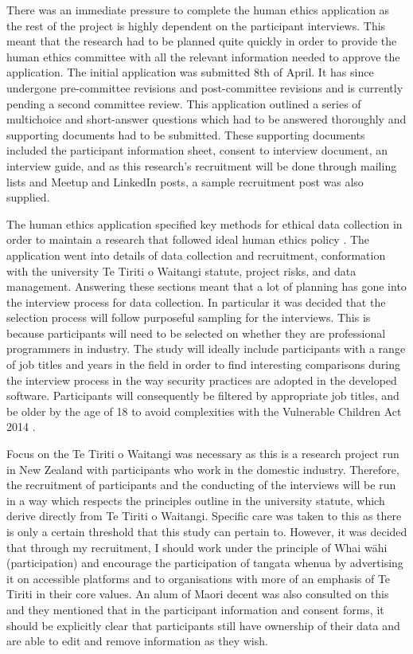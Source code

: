 \par There was an immediate pressure to complete the human ethics application as the rest of the project is highly dependent on the participant interviews. This meant that the research had to be planned quite quickly in order to provide the human ethics committee with all the relevant information needed to approve the application. The initial application was submitted 8th of April. It has since undergone pre-committee revisions and post-committee revisions and is currently pending a second committee review. This application outlined a series of multichoice and short-answer questions which had to be answered thoroughly and supporting documents had to be submitted. These supporting documents included the participant information sheet, consent to interview document, an interview guide, and as this research’s recruitment will be done through mailing lists and Meetup and LinkedIn posts, a sample recruitment post was also supplied. 
\newline
\par The human ethics application specified key methods for ethical data collection in order to maintain a research that followed ideal  human ethics policy \cite{hepol}. The application went into details of data collection and recruitment, conformation with the university Te Tiriti o Waitangi statute, project risks, and data management. Answering these sections meant that a lot of planning has gone into the interview process for data collection. In particular it was decided that the selection process will follow purposeful sampling for the interviews. This is because participants will need to be selected on whether they are professional programmers in industry. The study will ideally include participants with a range of job titles and years in the field in order to find interesting comparisons during the interview process in the way security practices are adopted in the developed software. Participants will consequently be filtered by appropriate job titles, and be older by the age of 18 to avoid complexities with the Vulnerable Children Act 2014 \cite{childact}.
\newline
\par Focus on the Te Tiriti o Waitangi was necessary as this is a research project run in New Zealand with participants who work in the domestic industry. Therefore, the recruitment of participants and the conducting of the interviews will be run in a way which respects the principles outline in the university statute, which derive directly from Te Tiriti o Waitangi. Specific care was taken to this as there is only a certain threshold that this study can pertain to. However, it was decided that through my recruitment, I should work under the principle of Whai wāhi (participation) and encourage the participation of tangata whenua by advertising it on accessible platforms and to organisations with more of an emphasis of Te Tiriti in their core values. An alum of Maori decent was also consulted on this and they mentioned that in the participant information and consent forms, it should be explicitly clear that participants still have ownership of their data and are able to edit and remove information as they wish. 
